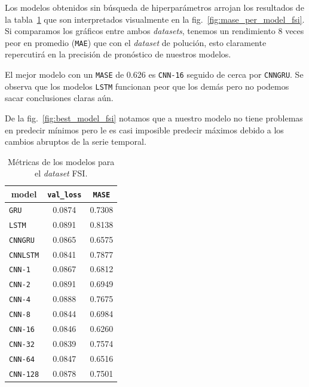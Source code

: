 \documentclass[a4paper,12pt]{article}
\begin{document}
Los modelos obtenidos sin búsqueda de hiperparámetros arrojan los resultados de la tabla~\ref{tab:score_table_fsi} que son interpretados visualmente en la fig.~\ref{fig:mase_per_model_fsi}. Si comparamos los gráficos entre ambos \textit{datasets}, tenemos un rendimiento 8 veces peor en promedio (\texttt{MAE}) que con el \textit{dataset} de polución, esto claramente repercutirá en la precisión de pronóstico de nuestros modelos.

El mejor modelo con un \texttt{MASE} de 0.626 es \texttt{CNN-16} seguido de cerca por \texttt{CNNGRU}. Se observa que los modelos \texttt{LSTM} funcionan peor que los demás pero no podemos sacar conclusiones claras aún.

De la fig.~\ref{fig:best_model_fsi} notamos que a nuestro modelo no tiene problemas en predecir mínimos pero le es casi imposible predecir máximos debido a los cambios abruptos de la serie temporal.

\begin{table}[]
\centering
\begin{tabular}{lcc}
\hline
\multicolumn{1}{c}{{model}} & \multicolumn{1}{c}{\texttt{val\_loss}} & \multicolumn{1}{c}{\texttt{MASE}} \\ \hline
\texttt{GRU}     & 0.0874 & 0.7308 \\
\texttt{LSTM}    & 0.0891 & 0.8138 \\
\texttt{CNNGRU}  & 0.0865 & 0.6575 \\
\texttt{CNNLSTM} & 0.0841 & 0.7877 \\
\texttt{CNN-1}   & 0.0867 & 0.6812 \\
\texttt{CNN-2}   & 0.0891 & 0.6949 \\
\texttt{CNN-4}   & 0.0888 & 0.7675 \\
\texttt{CNN-8}   & 0.0844 & 0.6984 \\
\texttt{CNN-16}  & 0.0846 & 0.6260 \\
\texttt{CNN-32}  & 0.0839 & 0.7574 \\
\texttt{CNN-64}  & 0.0847 & 0.6516 \\
\texttt{CNN-128} & 0.0878 & 0.7501 \\ \hline
\end{tabular}
\caption{Métricas de los modelos para el \textit{dataset} FSI.}
\label{tab:score_table_fsi}
\end{table}
\end{document}
